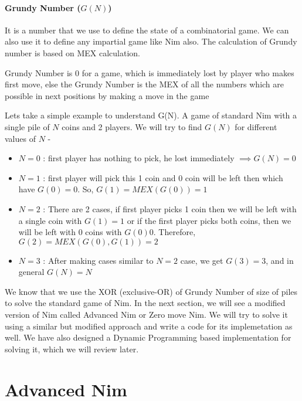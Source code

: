 \documentclass[11pt]{article}
\begin{document}
\subsection{Grundy Number ($G(N)$)}
It is a number that we use to define the state of a combinatorial game. We can also use it to define any impartial game like Nim also. The calculation of Grundy number is based on MEX calculation. \\
\begin{definition}
    Grundy Number is $0$ for a game, which is immediately lost by player who makes first move, else the Grundy Number is the MEX of all the numbers which are possible in next positions by making a move in the game
\end{definition}
\begin{example}
    Lets take a simple example to understand G(N). A game of standard Nim with a single pile of $N$ coins and 2 players. We will try to find $G(N)$ for different values of $N$ -
    \begin{itemize}
        \item $N = 0$ : first player has nothing to pick, he lost immediately $\implies G(N) = 0$ 
        \item $N = 1$ : first player will pick this 1 coin and 0 coin will be left then which have $G(0) = 0$. So, $G(1) = MEX({G(0)}) = 1$
        \item $N = 2$ : There are 2 cases, if first player picks 1 coin then we will be left with a single coin with $G(1) = 1$ or if the first player picks both coins, then we will be left with 0 coins with $G(0) 0$. Therefore, $G(2) = MEX({G(0), G(1)}) = 2$
        \item $N = 3$ : After making cases similar to $N = 2$ case, we get $G(3) = 3$, and in general $G(N) = N$
    \end{itemize}
\end{example}
We know that we use the XOR (exclusive-OR) of Grundy Number of size of piles to solve the standard game of Nim. In the next section, we will see a modified version of Nim called Advanced Nim or Zero move Nim. We will try to solve it using a similar but modified approach and write a code for its implemetation as well. We have also designed a Dynamic Programming based implementation for solving it, which we will review later.
\newpage

\part{Advanced Nim}
\vspace{2mm}
\end{document}
